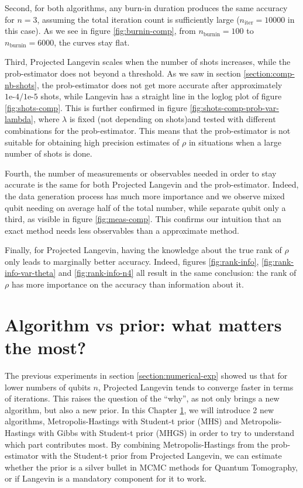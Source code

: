 \documentclass[12pt]{memoir}
\newcommand{\nitern}[1]{$n_{\text{iter}}=#1$}
\newcommand{\nburninn}[1]{$n_{\text{burnin}}=#1$}
\begin{document}
Second, for both algorithms, any burn-in duration produces the same accuracy for $n=3$, assuming the total iteration count is sufficiently large (\nitern{10000} in this case). As we see in figure \ref{fig:burnin-comp}, from \nburninn{100} to \nburninn{6000}, the curves stay flat.\medbreak

Third, Projected Langevin scales when the number of shots increases, while the prob-estimator does not beyond a threshold. As we saw in section \ref{section:comp-nb-shots}, the prob-estimator does not get more accurate after approximately $1\text{e-}4/1\text{e-}5$ shots, while Langevin has a straight line in the loglog plot of figure \ref{fig:shots-comp}. This is further confirmed in figure \ref{fig:shots-comp-prob-var-lambda}, where $\lambda$ is fixed (not depending on shots)and tested with different combinations for the prob-estimator. This means that the prob-estimator is not suitable for obtaining high precision estimates of $\rho$ in situations when a large number of shots is done.\medbreak

Fourth, the number of measurements or observables needed in order to stay accurate is the same for both Projected Langevin and the prob-estimator. Indeed, the data generation process has much more importance and we observe mixed qubit needing on average half of the total number, while separate qubit only a third, as visible in figure \ref{fig:meas-comp}. This confirms our intuition that an exact method needs less observables than a approximate method.\medbreak

Finally, for Projected Langevin, having the knowledge about the true rank of $\rho$ only leads to marginally better accuracy. Indeed, figures \ref{fig:rank-info}, \ref{fig:rank-info-var-theta} and \ref{fig:rank-info-n4} all result in the same conclusion: the rank of $\rho$ has more importance on the accuracy than information about it.

\chapter{Algorithm vs prior: what matters the most?}\label{section:algo-vs-prior}
The previous experiments in section \ref{section:numerical-exp} showed us that for lower numbers of qubits $n$, Projected Langevin tends to converge faster in terms of iterations. This raises the question of the ``why'', as \cite{meth:bayesian:Langevin:ACMT2024} not only brings a new algorithm, but also a new prior. In this Chapter \ref{section:algo-vs-prior}, we will introduce 2 new algorithms, Metropolis-Hastings with Student-t prior (MHS) and Metropolis-Hastings with Gibbs with Student-t prior (MHGS) in order to try to understand which part contributes most. By combining Metropolis-Hastings from the prob-estimator with the Student-t prior from Projected Langevin, we can estimate whether the prior is a silver bullet in MCMC methods for Quantum Tomography, or if Langevin is a mandatory component for it to work.\medbreak
\end{document}
